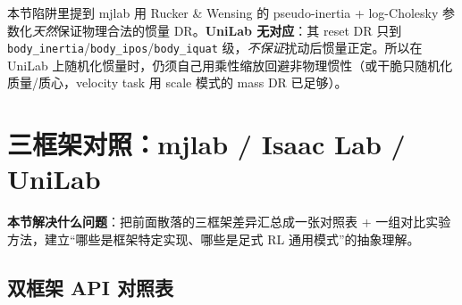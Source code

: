 \begin{note}
本节陷阱里提到 mjlab 用 Rucker \& Wensing 的 pseudo-inertia + log-Cholesky 参数化\emph{天然}保证物理合法的惯量 DR。\textbf{UniLab 无对应}：其 reset DR 只到 \verb|body_inertia|/\allowbreak\verb|body_ipos|/\allowbreak\verb|body_iquat| 级，\emph{不保证}扰动后惯量正定。所以在 UniLab 上随机化惯量时，仍须自己用乘性缩放回避非物理惯性（或干脆只随机化质量/质心，velocity task 用 scale 模式的 mass DR 已足够）。
\end{note}


\section{三框架对照：mjlab / Isaac Lab / UniLab}
\label{sec:rlmc-ql-dualframework}

\textbf{本节解决什么问题}：把前面散落的三框架差异汇总成一张对照表 + 一组对比实验方法，建立“哪些是框架特定实现、哪些是足式 RL 通用模式”的抽象理解。

\subsection{双框架 API 对照表}
\label{sec:rlmc-ql-dualframework-api}


